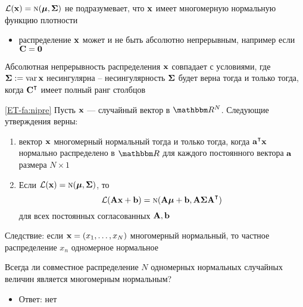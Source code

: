 \begin{frame}
    
    \vspace{2em}
   $\mathcal L({\mathbf x}) = \textrm{\sc n}({\boldsymbol \mu}, {\boldsymbol \Sigma})$ не подразумевает, что
    ${\mathbf x}$ имеет многомерную нормальную функцию плотности
    \begin{itemize}
        \item распределение ${\mathbf x}$ может и не быть абсолютно непрерывным, 
        например если $\mathbf C = {\mathbf 0}$ 
    \end{itemize}
    
    \vspace{1em}
    Абсолютная непрерывность распределения ${\mathbf x}$ совпадает с 
    условиями, где ${\boldsymbol \Sigma} := \operatorname{var} {\mathbf x}$ несингулярна -- 
    несингулярность ${\boldsymbol \Sigma}$ будет верна тогда и только тогда, когда
    $\boldC^\T$ имеет полный ранг столбцов
    
\end{frame}

\begin{frame}
    
    \vspace{2em}
    \Fact\eqref{ET-fa:nipre}
    Пусть ${\mathbf x}$ --- случайный вектор в $\RR^N$. Следующие утверждения верны:
    \begin{enumerate}
        \item вектор ${\mathbf x}$ многомерный нормальный тогда и только тогда, когда
            $\bolda^\T \boldx$ нормально распределено в $\RR$ для каждого
            постоянного вектора ${\mathbf a}$ размера $N \times 1$ 
        \item Если $\mathcal L({\mathbf x}) = \textrm{\sc n}({\boldsymbol \mu}, {\boldsymbol \Sigma})$, то 
            \begin{equation*}
                  \lL(\boldA \boldx + \boldb) = \nN(\boldA \boldmu + \boldb, \boldA
                    \boldSigma \boldA^\T)  
            \end{equation*}
            для всех постоянных согласованных $\mathbf A, {\mathbf b}$
    \end{enumerate}
    
\end{frame}

\begin{frame}

    \vspace{2em}
    Следствие: если ${\mathbf x} = (x_1,
    \ldots, x_N)$ многомерный нормальный, то частное распределение 
    $x_n$ одномерное нормальное
    
    Всегда ли совместное распределение $N$ одномерных нормальных случайных величин 
    является многомерным нормальным? 
    \begin{itemize}
        \item Ответ: нет
    \end{itemize}
    
\end{frame}


